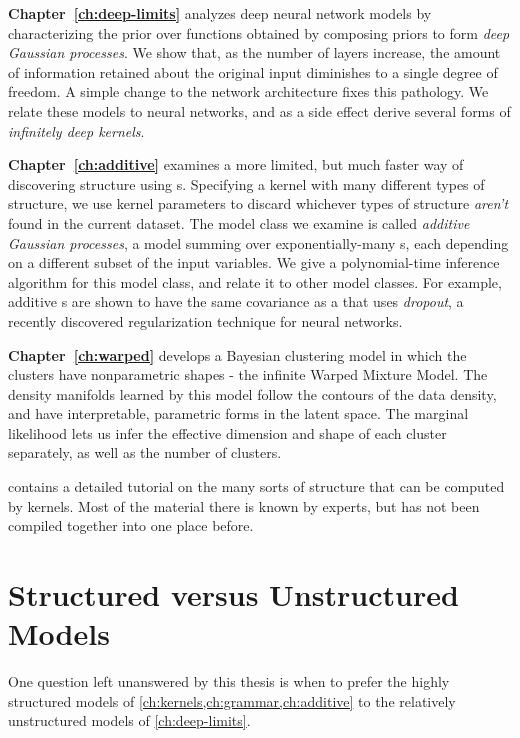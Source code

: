 {\bf Chapter~\ref{ch:deep-limits}} analyzes deep neural network models by characterizing the prior over functions obtained by composing \gp{} priors to form \emph{deep Gaussian processes}.
We show that, as the number of layers increase, the amount of information retained about the original input diminishes to a single degree of freedom.
A simple change to the network architecture fixes this pathology.
We relate these models to neural networks, and as a side effect derive several forms of \emph{infinitely deep kernels}.

{\bf Chapter~\ref{ch:additive}} examines a more limited, but much faster way of discovering structure using \gp{}s.
Specifying a kernel with many different types of structure, we use kernel parameters to discard whichever types of structure \emph{aren't} found in the current dataset.
The model class we examine is called \emph{additive Gaussian processes}, a model summing over exponentially-many \gp{}s, each depending on a different subset of the input variables.
We give a polynomial-time inference algorithm for this model class, and relate it to other model classes.
For example, additive \gp{}s are shown to have the same covariance as a \gp{} that uses \emph{dropout}, a recently discovered regularization technique for neural networks.

{\bf Chapter~\ref{ch:warped}} develops a Bayesian clustering model in which the clusters have nonparametric shapes - the infinite Warped Mixture Model.
The density manifolds learned by this model follow the contours of the data density, and have interpretable, parametric forms in the latent space.
The marginal likelihood lets us infer the effective dimension and shape of each cluster separately, as well as the number of clusters.





 contains a detailed tutorial on the many sorts of structure that can be computed by kernels.
Most of the material there is known by experts, but has not been compiled together into one place before.

\section{Structured versus Unstructured \sgp{} Models}

One question left unanswered by this thesis is when to prefer the highly structured models of \cref{ch:kernels,ch:grammar,ch:additive} to the relatively unstructured models of \cref{ch:deep-limits}.

